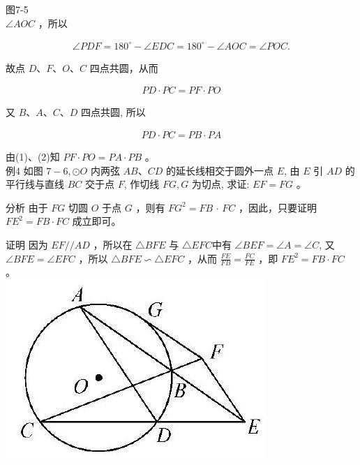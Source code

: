\documentclass[10pt]{article}
\begin{document}
图7-5\\
$\angle A O C$ ，所以

\begin{align*}
\angle P D F=180^{\circ}-\angle E D C=180^{\circ}-\angle A O C=\angle P O C .
\end{align*}

故点 $D 、 F 、 O 、 C$ 四点共圆，从而

\begin{align*}
P D \cdot P C=P F \cdot P O \tag{1}
\end{align*}

又 $B 、 A 、 C 、 D$ 四点共圆, 所以

\begin{align*}
P D \cdot P C=P B \cdot P A \tag{2}
\end{align*}

由(1)、(2)知 $P F \cdot P O=P A \cdot P B$ 。\\
例4 如图 $7-6, \odot O$ 内两弦 $A B 、 C D$ 的延长线相交于圆外一点 $E$, 由 $E$ 引 $A D$ 的平行线与直线 $B C$ 交于点 $F$, 作切线 $F G, G$ 为切点, 求证: $E F=F G$ 。

分析 由于 $F G$ 切圆 $O$ 于点 $G$ ，则有 $F G^{2}=F B$ $\cdot$ $F C$ ，因此，只要证明 $F E^{2}=F B \cdot F C$ 成立即可。

证明 因为 $E F / / A D$ ，所以在 $\triangle B F E$ 与 $\triangle E F C$中有 $\angle B E F=\angle A=\angle C$, 又 $\angle B F E=\angle E F C$ ，所以 $\triangle B F E \backsim \triangle E F C$ ，从而 $\frac{F E}{F B}=\frac{F C}{F E}$ ，即 $F E^{2}=F B \cdot F C$ 。\\
\includegraphics[max width=\textwidth, center]{2024_10_30_66b8e5e701da2093c133g-053}
\end{document}
